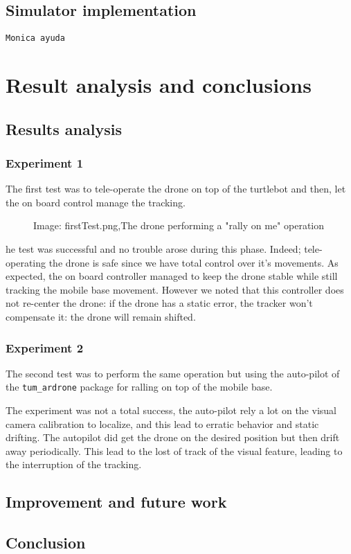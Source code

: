 \documentclass[11pt,a4paper]{article}
\newcommand{\centerFigure}[2]{
	\begin{figure}[h]
	\centering
	Image: #1
	
	
	\label{fig1:#2}
	\end{figure}
}
\newcommand{\Monica}{\texttt{Monica ayuda}}
\begin{document}
\subsection{Simulator implementation}
\Monica


\section{Result analysis and conclusions}
\subsection{Results analysis}
\subsubsection{Experiment 1}
The first test was to tele-operate the drone on top of the turtlebot and then, let the on board control
manage the tracking.
\centerFigure{firstTest.png,The drone performing a "rally on me" operation}
The test was successful and no trouble arose during this phase. Indeed; tele-operating the drone is 
safe since we have total control over it's movements.
As expected, the on board controller managed to keep the drone stable while still tracking the mobile base 
movement. However we noted that this controller does not re-center the drone: if the drone has a static
error, the tracker won't compensate it: the drone will remain shifted.

\subsubsection{Experiment 2}
The second test was to perform the same operation but using the auto-pilot of the \verb!tum_ardrone!
package for ralling on top of the mobile base.

The experiment was not a total success, the auto-pilot rely a lot on the visual camera calibration to 
localize, and this lead to erratic behavior and static drifting.
The autopilot did get the drone on the desired position but then drift away periodically. This lead to the 
lost of track of the visual feature, leading to the interruption of the tracking.
\subsection{Improvement and future work}
\subsection{Conclusion}




\end{document}
